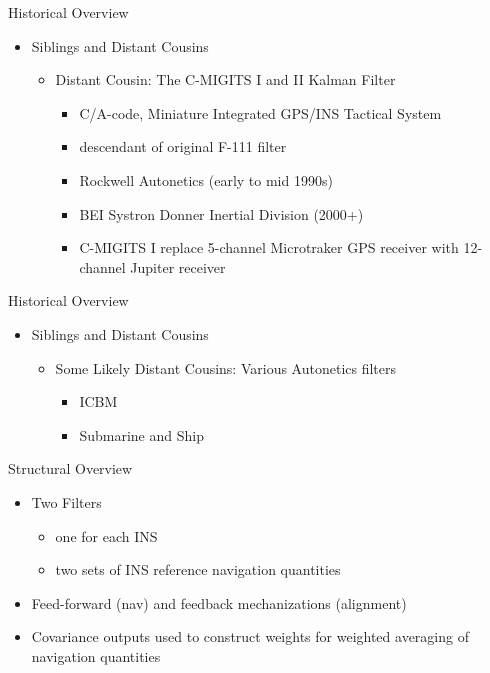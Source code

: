 \begin{frame}
Historical Overview
\begin{itemize}
  \item Siblings and Distant Cousins
 \begin{itemize}
    \item Distant Cousin: The C-MIGITS I and II Kalman Filter
    \begin{itemize}
		\item C/A-code, Miniature Integrated GPS/INS Tactical System
		\item descendant of original F-111 filter
		\item Rockwell Autonetics (early to mid 1990s)
		\item BEI Systron Donner Inertial Division (2000+)
		\item C-MIGITS I replace 5-channel Microtraker GPS receiver with 12-channel Jupiter receiver 
    \end{itemize}
  \end{itemize}
\end{itemize} 
\end{frame}

\begin{frame}
Historical Overview
\begin{itemize}
  \item Siblings and Distant Cousins
 \begin{itemize}
    \item Some Likely Distant Cousins: Various Autonetics filters 
	\begin{itemize}
		\item ICBM
		\item Submarine and Ship
	\end{itemize}
 \end{itemize}
\end{itemize}
\end{frame}

\begin{frame}
Structural Overview
\begin{itemize}
  \item Two Filters
	\begin{itemize}
		\item one for each INS
		\item two sets of INS reference navigation quantities
	\end{itemize}
  \item Feed-forward (nav) and feedback mechanizations (alignment)
  \item Covariance outputs used to construct weights for weighted averaging of navigation quantities
\end{itemize} 
\end{frame}

